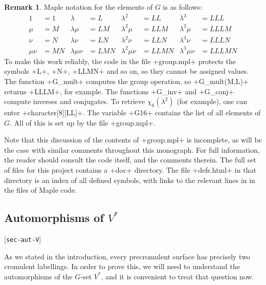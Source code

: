 \documentclass[reqno]{amsart}
\newcommand{\lbl}[1]{\label{#1}\textup{[\texttt{#1}]}\par}
\newcommand{\lbl}{\label}
\newcommand{\lm}        {\lambda}
\renewcommand{\:}{\colon}
\theoremstyle{definition}
\newtheorem{remark}[theorem]{Remark}
\begin{document}
\begin{remark}
 Maple notation for the elements of $G$ is as follows:
 \begin{align*}
   1      &= 1  & \lm       &= L   & \lm^2       &= LL   & \lm^3       &= LLL  \\
   \mu    &= M  & \lm\mu    &= LM  & \lm^2\mu    &= LLM  & \lm^3\mu    &= LLLM \\
   \nu    &= N  & \lm\nu    &= LN  & \lm^2\nu    &= LLN  & \lm^3\nu    &= LLLN \\
   \mu\nu &= MN & \lm\mu\nu &= LMN & \lm^2\mu\nu &= LLMN & \lm^3\mu\nu &= LLLMN
 \end{align*}
 To make this work reliably, the code in the file \fname+group.mpl+
 protects the symbols \mcode+L+, \mcode+N+, \mcode+LLMN+ and so on, so
 they cannot be assigned values.  The function \mcode+G_mult+ computes
 the group operation, so \mcode+G_mult(M,L)+ returns \mcode+LLLM+, for
 example.  The functions \mcode+G_inv+ and \mcode+G_conj+ compute
 inverses and conjugates.  To retrieve $\chi_8(\lm^2)$ (for example),
 one can enter \mcode+character[8][LL]+.  The variable \mcode+G16+
 contains the list of all elements of $G$.  All of this is set up by
 the file \fname+group.mpl+.

 Note that this discussion of the contents of \fname+group.mpl+ is
 incomplete, as will be the case with similar comments throughout this
 monograph.  For full information, the reader should consult the code
 itself, and the comments therein.  The full set of files for this
 project contains a \fname+doc+ directory.  The file \fname+defs.html+
 in that directory is an index of all defined symbols, with links to
 the relevant lines in in the files of Maple code.
\end{remark}

\subsection{Automorphisms of \texorpdfstring{$V^*$}{V*}}
\lbl{sec-aut-V}

As we stated in the introduction, every precromulent surface has
precisely two cromulent labellings.  In order to prove this, we will
need to understand the automorphisms of the $G$-set $V^*$, and it is
convenient to treat that question now.
\end{document}
